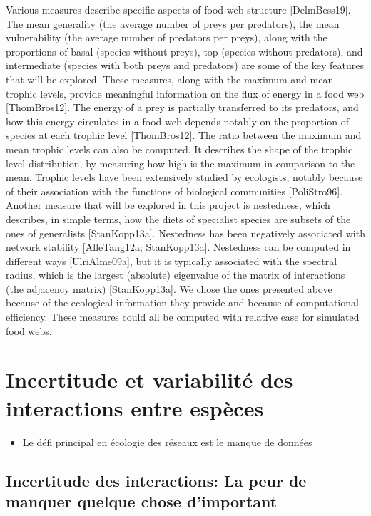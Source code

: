 Various measures describe specific aspects of food-web structure [DelmBess19].
The mean
generality (the average number of preys per predators), the mean vulnerability
(the average number of predators per preys), along with the proportions of basal
(species without preys), top (species without predators), and intermediate
(species with both preys and predators) are some of the key features that will
be explored. These measures, along with the maximum and mean trophic levels,
provide meaningful information on the flux of energy in a food web
[ThomBros12]. The energy of a prey is partially transferred to its predators,
and how this energy circulates in a food web depends notably on the proportion
of species at each trophic level [ThomBros12]. The ratio between the maximum
and mean trophic levels can also be computed. It describes the shape of the
trophic level distribution, by measuring how high is the maximum in comparison
to the mean. Trophic levels have been extensively studied by ecologists, notably
because of their association with the functions of biological communities
[PoliStro96]. Another measure that will be explored in this project is
nestedness, which describes, in simple terms, how the diets of specialist
species are subsets of the ones of generalists [StanKopp13a]. Nestedness has
been negatively associated with network stability [AlleTang12a; StanKopp13a].
Nestedness can be computed in different ways [UlriAlme09a], but it is typically
associated with the spectral radius, which is the largest (absolute) eigenvalue
of the matrix of interactions (the adjacency matrix) [StanKopp13a]. We chose the ones presented
above because of the ecological information they provide and because of
computational efficiency. These measures could all be computed with relative
ease for simulated food webs.


\section{Incertitude et variabilité des interactions entre espèces}

\begin{itemize}
    \item Le défi principal en écologie des réseaux est le manque de données
\end{itemize}

\subsection{Incertitude des interactions: La peur de manquer quelque chose d'important} 


